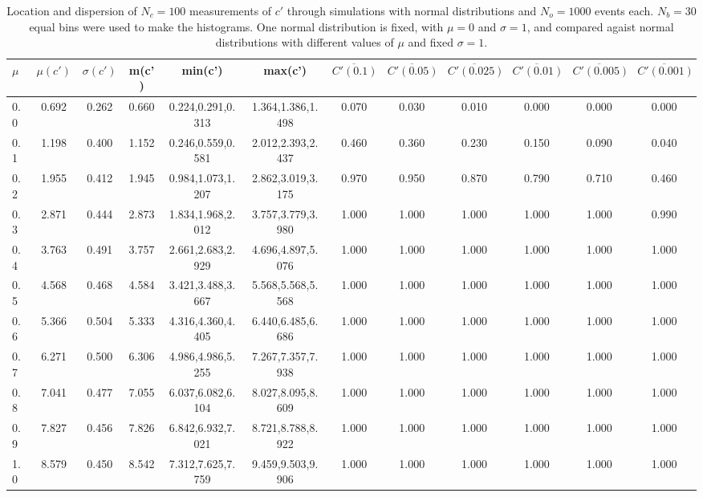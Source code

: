 \begin{table*}[h!]
\begin{center}
\begin{tabular}{| l | c | c | c | c | c | c | c | c | c | c | c |}\hline
$\mu$ & $\mu(c')$ & $\sigma(c')$ & m(c') & min(c') & max(c') & $\overline{C'(0.1)}$ & $\overline{C'(0.05)}$ & $\overline{C'(0.025)}$ & $\overline{C'(0.01)}$ & $\overline{C'(0.005)}$ & $\overline{C'(0.001)}$ \\\hline
0.0 & 0.692 & 0.262 & 0.660 & 0.224,0.291,0.313 & 1.364,1.386,1.498  & 0.070  & 0.030  & 0.010  & 0.000  & 0.000  & 0.000 \\\hline
0.1 & 1.198 & 0.400 & 1.152 & 0.246,0.559,0.581 & 2.012,2.393,2.437  & 0.460  & 0.360  & 0.230  & 0.150  & 0.090  & 0.040 \\\hline
0.2 & 1.955 & 0.412 & 1.945 & 0.984,1.073,1.207 & 2.862,3.019,3.175  & 0.970  & 0.950  & 0.870  & 0.790  & 0.710  & 0.460 \\\hline
0.3 & 2.871 & 0.444 & 2.873 & 1.834,1.968,2.012 & 3.757,3.779,3.980  & 1.000  & 1.000  & 1.000  & 1.000  & 1.000  & 0.990 \\\hline
0.4 & 3.763 & 0.491 & 3.757 & 2.661,2.683,2.929 & 4.696,4.897,5.076  & 1.000  & 1.000  & 1.000  & 1.000  & 1.000  & 1.000 \\\hline
0.5 & 4.568 & 0.468 & 4.584 & 3.421,3.488,3.667 & 5.568,5.568,5.568  & 1.000  & 1.000  & 1.000  & 1.000  & 1.000  & 1.000 \\\hline
0.6 & 5.366 & 0.504 & 5.333 & 4.316,4.360,4.405 & 6.440,6.485,6.686  & 1.000  & 1.000  & 1.000  & 1.000  & 1.000  & 1.000 \\\hline
0.7 & 6.271 & 0.500 & 6.306 & 4.986,4.986,5.255 & 7.267,7.357,7.938  & 1.000  & 1.000  & 1.000  & 1.000  & 1.000  & 1.000 \\\hline
0.8 & 7.041 & 0.477 & 7.055 & 6.037,6.082,6.104 & 8.027,8.095,8.609  & 1.000  & 1.000  & 1.000  & 1.000  & 1.000  & 1.000 \\\hline
0.9 & 7.827 & 0.456 & 7.826 & 6.842,6.932,7.021 & 8.721,8.788,8.922  & 1.000  & 1.000  & 1.000  & 1.000  & 1.000  & 1.000 \\\hline
1.0 & 8.579 & 0.450 & 8.542 & 7.312,7.625,7.759 & 9.459,9.503,9.906  & 1.000  & 1.000  & 1.000  & 1.000  & 1.000  & 1.000 \\\hline
\end{tabular}
\caption{Location and dispersion of $N_c=100$
measurements of $c'$ through simulations
with normal distributions and $N_o=1000$ events each.
$N_b=30$ equal bins were used to make the histograms.
One normal distribution is fixed, with $\mu=0$ and $\sigma=1$,
and compared agaist normal distributions with different values of $\mu$ and fixed $\sigma=1$.}
\end{center}
\end{table*}
